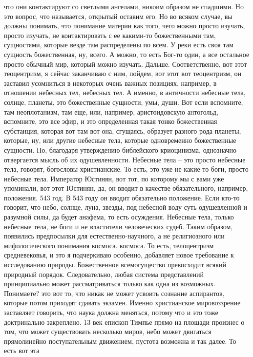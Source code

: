 что они контактируют со светлыми ангелами, никоим образом не спадшими. Но это
вопрос, что называется, открытый оставим его. Но во всяком случае, вы должны
понимать, что понимание материи как того, чего можно просто изучать, просто
изучать, не контактировать с ее какими-то божественными там, сущностями, которые
везде там распределены по всем. У реки есть своя там сущность божественная, ну,
всего. А можно, то есть Бог-то один, а все остальное просто обычный мир, который
можно изучать. Дальше. Соответственно, вот этот теоцентризм, я сейчас заканчиваю
с ним, пойдем, вот этот вот теоцентризм, он заставил усомниться в некоторых
очень важных позициях, например, в отношении небесных тел, небесных тел. А
именно, в античности небесные тела, солнце, планеты, это божественные сущности,
умы, души. Вот если вспомните, там неоплотанизм, там еще, или, например,
аристоидовскую антогольд, вспомните, это все эфир, и это определенная такая
тонко божественная субстанция, которая вот там вот она, сгущаясь, образует
разного рода планеты, которые, ну, или другие небесные тела, которые
одновременно божественные сущности. Но, благодаря утверждению библейского
криоцинизма, однозначно отвергается мысль об их одушевленности. Небесные тела –
это просто небесные тела, говорят, богословы христианские. То есть, это уже не
какие-то боги, просто небесные тела. Император Юстинян, вот тот, по которому мы
с вами уже упоминали, вот этот Юстинян, да, он вводит в качестве обязательного,
например, положения. 543 год. В 543 году он вводит обязательно положение. Если
кто-то говорит, что небо, солнце, луна, звезды, под небесной воду суть
одушевленной и разумной силы, да будет анафема, то есть осуждения. Небесные
тела, только небесные тела, не боги и не властители человеческих судеб. Таким
образом, появились предпосылки для естественно-научного, а не религиозного или
мифологического понимания космоса. космоса. То есть, телоцентризм средневековья,
и это я подчеркиваю особенно, добавляет новое требование к исследованию природы.
Божественное всемогущество превосходит всякий природный порядок. Следовательно,
любая система представлений принципиально может рассматриваться только как одна
из возможных. Понимаете? это вот то, что никак не может усвоить сознание
аспирантов, которые потом приходят сдавать экзамен. Именно христианское
мировоззрение заставляет говорить, что наука должна меняться, потому что и это
тоже доктринально закреплено. 13 век епископ Тимпье прямо на площади произнес о
том, что может существовать несколько миров, небо может двигаться прямолинейно
поступательным движением, пустота возможна и так далее. То есть вот эта

